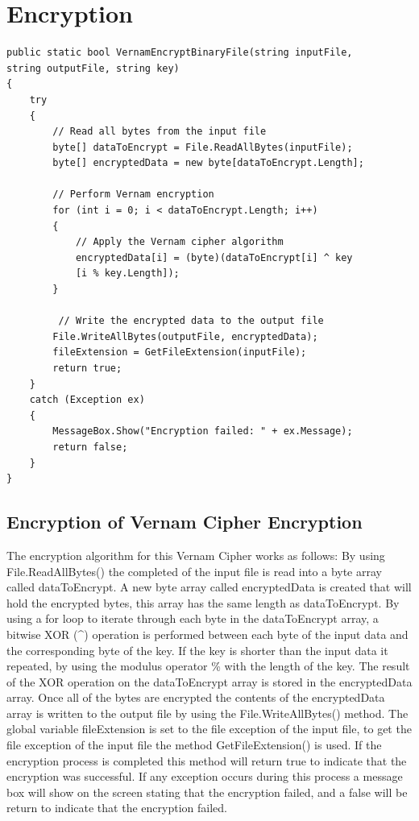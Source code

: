 \documentclass[a4paper,oneside,11pt]{book}
\begin{document}
\section{Encryption}
\begin{lstlisting}[language=Csh, caption={Code for Vernam Cipher Encryption}]
public static bool VernamEncryptBinaryFile(string inputFile, 
string outputFile, string key)
{
    try
    {
        // Read all bytes from the input file
        byte[] dataToEncrypt = File.ReadAllBytes(inputFile);
        byte[] encryptedData = new byte[dataToEncrypt.Length];
    
        // Perform Vernam encryption
        for (int i = 0; i < dataToEncrypt.Length; i++)
        {
            // Apply the Vernam cipher algorithm
            encryptedData[i] = (byte)(dataToEncrypt[i] ^ key
            [i % key.Length]);
        }
    
         // Write the encrypted data to the output file
        File.WriteAllBytes(outputFile, encryptedData);
        fileExtension = GetFileExtension(inputFile);
        return true;
    }
    catch (Exception ex)
    {
        MessageBox.Show("Encryption failed: " + ex.Message);
        return false;
    }
}
\end{lstlisting}

\subsection{Encryption of Vernam Cipher Encryption}

The encryption algorithm for this Vernam Cipher works as follows:
By using File.ReadAllBytes() the completed of the input file is read into a byte array called dataToEncrypt. A new byte array called encryptedData is created that will hold the encrypted bytes, this array has the same length as dataToEncrypt. By using a for loop to iterate through each byte in the dataToEncrypt array, a bitwise XOR (\^{}) operation is performed between each byte of the input data and the corresponding byte of the key. If the key is shorter than the input data it repeated, by using the modulus operator \% with the length of the key. The result of the XOR operation on the  dataToEncrypt array is stored in the encryptedData array. Once all of the bytes are encrypted the contents of the encryptedData array is written to the output file by using the File.WriteAllBytes() method. The global variable fileExtension is set to the file exception of the input file, to get the file exception of the input file the method GetFileExtension() is used. If the encryption process is completed this method will return true to indicate that the encryption was successful. If any exception occurs during this process a message box will show on the screen stating that the encryption failed, and a false will be return to indicate that the encryption failed.
\end{document}
